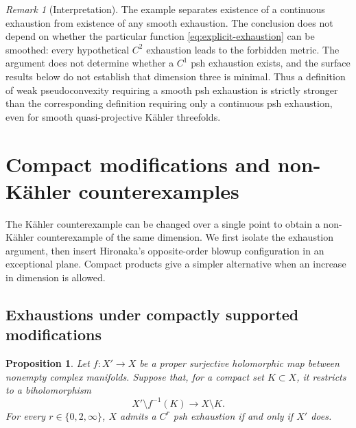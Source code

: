 \documentclass[11pt]{amsart}
\newtheorem{proposition}[theorem]{Proposition}
\theoremstyle{definition}
\theoremstyle{remark}
\newtheorem{remark}[theorem]{Remark}
\numberwithin{equation}{section}
\begin{document}
\begin{remark}[Interpretation]
The example separates existence of a continuous exhaustion from
existence of any smooth exhaustion. The conclusion does not depend on
whether the particular function \eqref{eq:explicit-exhaustion} can be
smoothed: every hypothetical $C^2$ exhaustion leads to the forbidden
metric. The argument does not determine whether a $C^1$ psh
exhaustion exists, and the surface results below do not establish that
dimension three is minimal. Thus a definition of weak pseudoconvexity
requiring a smooth
psh exhaustion is strictly stronger than the corresponding definition
requiring only a continuous psh exhaustion, even for smooth
quasi-projective K\"ahler threefolds.
\end{remark}

\section{Compact modifications and non-K\"ahler counterexamples}
\label{sec:nonkahler}

The K\"ahler counterexample can be changed over a single point to obtain
a non-K\"ahler counterexample of the same dimension.  We first isolate
the exhaustion argument, then insert Hironaka's opposite-order blowup
configuration in an exceptional plane.  Compact products give a simpler
alternative when an increase in dimension is allowed.

\subsection{Exhaustions under compactly supported modifications}

\begin{proposition}\label{prop:compact-modification}
Let $f:X'\to X$ be a proper surjective holomorphic map between nonempty
complex manifolds.  Suppose that, for a compact set $K\subset X$, it
restricts to a biholomorphism
\[
 X'\setminus f^{-1}(K)\longrightarrow X\setminus K.
\]
For every $r\in\{0,2,\infty\}$, $X$ admits a $C^r$ psh exhaustion
if and only if $X'$ does.
\end{proposition}
\end{document}
